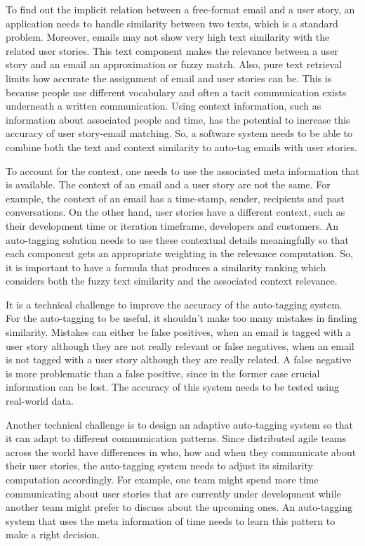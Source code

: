 To find out the implicit relation between a free-format email and a user story, an application needs to handle similarity between two texts, which is a standard problem. Moreover, emails may not show very high text similarity with the related user stories. This text component makes the relevance between a user story and an email an approximation or fuzzy match. Also, pure text retrieval limits how accurate the assignment of email and user stories can be. This is because people use different vocabulary and often a tacit communication exists underneath a written communication. Using context information, such as information about associated people and time, has the potential to increase this accuracy of user story-email matching. So, a software system needs to be able to combine both the text and context similarity to auto-tag emails with user stories.

To account for the context, one needs to use the associated meta information that is available. The context of an email and a user story are not the same. For example, the context of an email has a time-stamp, sender, recipients and past conversations. On the other hand, user stories have a different context, such as their development time or iteration timeframe, developers and customers. An auto-tagging solution needs to use these contextual details meaningfully so that each component gets an appropriate weighting in the relevance computation. So, it is important to have a formula that produces a similarity ranking which considers both the fuzzy text similarity and the associated context relevance.

It is a technical challenge to improve the accuracy of the auto-tagging system. For the auto-tagging to be useful, it shouldn't make too many mistakes in finding similarity. Mistakes can either be false positives, when an email is tagged with a user story although they are not really relevant or false negatives, when an email is not tagged with a user story although they are really related. A false negative is more problematic than a false positive, since in the former case crucial information can be lost. The accuracy of this system needs to be tested using real-world data. 

Another technical challenge is to design an adaptive auto-tagging system so that it can adapt to different communication patterns. Since distributed agile teams across the world have differences in who, how and when they communicate about their user stories, the auto-tagging system needs to adjust its similarity computation accordingly. For example, one team might spend more time communicating about user stories that are currently under development while another team might prefer to discuss about the upcoming ones. An auto-tagging system that uses the meta information of time needs to learn this pattern to make a right decision.


